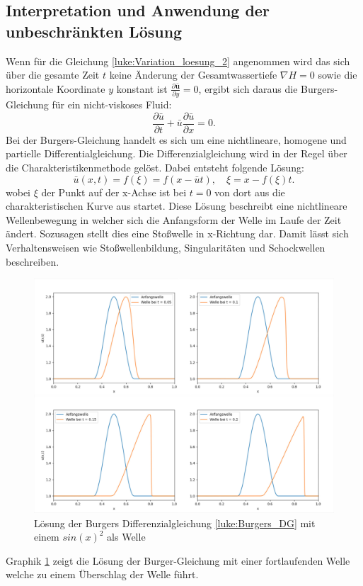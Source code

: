 \subsection{Interpretation und Anwendung der unbeschränkten Lösung}
Wenn für die Gleichung \eqref{luke:Variation_loesung_2} angenommen wird das sich über die gesamte Zeit $t$ keine Änderung der Gesamtwassertiefe $ \nabla H = 0 $ sowie die horizontale Koordinate $y$ konstant ist $\frac{\partial \bar{\bm{u}}}{\partial y} = 0$, ergibt sich daraus die Burgers-Gleichung für ein nicht-viskoses Fluid:
\begin{equation}
	\frac{\partial \bar{u}}{\partial t} + \bar{u} \frac{\partial \bar{u}}{\partial x} = 0.
	\label{luke:Burgers_DG}
\end{equation}
Bei der Burgers-Gleichung handelt es sich um eine nichtlineare, homogene und partielle Differentialgleichung.
Die Differenzialgleichung wird in der Regel über die Charakteristikenmethode gelöst. 
Dabei entsteht folgende Lösung:
\[
\bar{u}(x,t) = f(\xi) = f(x-\bar{u}t),\quad \xi = x-f(\xi)t.
\]
wobei $\xi$ der Punkt auf der x-Achse ist bei $t = 0$ von dort aus die charakteristischen Kurve aus startet.
Diese Lösung beschreibt eine nichtlineare Wellenbewegung in welcher sich die Anfangsform der Welle im Laufe der Zeit ändert.
Sozusagen stellt dies eine Stoßwelle in x-Richtung dar.
Damit lässt sich Verhaltensweisen wie Stoßwellenbildung, Singularitäten und Schockwellen beschreiben.
\begin{figure}
	\includegraphics[width=\textwidth]{papers/luke/fig/Burger_Loesung_Welle.jpg}
	\caption{Lösung der Burgers Differenzialgleichung \eqref{luke:Burgers_DG} mit einem $sin(x)^2$ als Welle
		\label{luke:fig:Loesung_Burgers}}
\end{figure}
Graphik \ref{luke:fig:Loesung_Burgers} zeigt die Lösung der Burger-Gleichung mit einer fortlaufenden Welle welche zu einem Überschlag der Welle führt.

